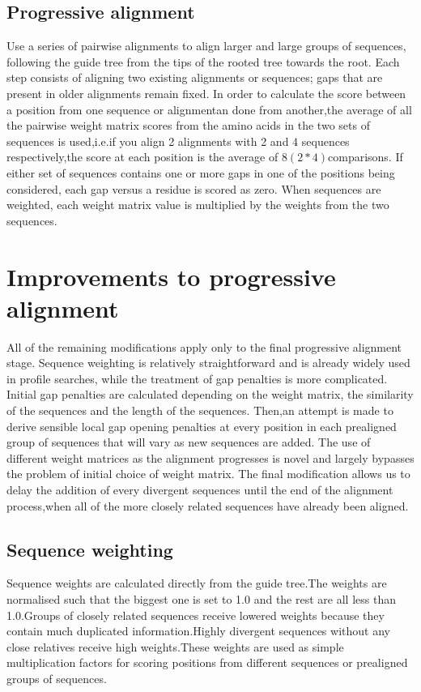 \subsection{Progressive alignment}
Use a series of pairwise alignments to align larger and large groups of sequences, following the guide tree from the tips of the rooted tree towards the root. 
Each step consists of aligning two existing alignments or sequences; gaps that are present in older alignments remain fixed.
In order to calculate the score between a position from one sequence or alignmentan done from another,the average of all the pairwise weight matrix scores from the amino acids in the two sets of sequences is used,i.e.if you align 2 alignments with 2 and 4 sequences respectively,the score at each position is the average of $8(2*4)$comparisons.
If either set of sequences contains one or more gaps in one of the positions being considered, each gap versus a residue is scored as zero.
When sequences are weighted, each weight matrix value is multiplied by the weights from the two sequences.

\section{Improvements to progressive alignment}
All of the remaining modifications apply only to the final progressive alignment stage. 
Sequence weighting is relatively straightforward and is already widely used in profile searches, while the treatment of gap penalties is more complicated. 
Initial gap penalties are calculated depending on the weight matrix, the similarity of the sequences and the length of the sequences.
Then,an attempt is made to derive sensible local gap opening penalties at every position in each prealigned group of sequences that will vary as new sequences are added. The use of different weight matrices as the alignment progresses is novel and largely  bypasses the problem of initial choice of weight matrix.
The final modification allows us to delay the addition of every divergent sequences until the end of the alignment process,when all of the more closely related sequences have already been aligned.

\subsection{Sequence weighting}
Sequence weights are calculated directly from the guide tree.The weights are normalised  such that the biggest one is set to 1.0 and the rest are all less than 1.0.Groups of closely related sequences receive lowered weights because they contain  much duplicated information.Highly  divergent sequences without any close relatives receive high weights.These weights are used as simple multiplication factors for scoring positions from different sequences or prealigned groups of sequences.

